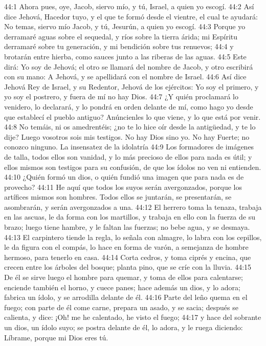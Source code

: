 44:1 Ahora pues, oye, Jacob, siervo mío, y tú, Israel, a quien yo escogí. 
44:2 Así dice Jehová, Hacedor tuyo, y el que te formó desde el vientre, el cual te ayudará: No temas, siervo mío Jacob, y tú, Jesurún, a quien yo escogí. 
44:3 Porque yo derramaré aguas sobre el sequedal, y ríos sobre la tierra árida; mi Espíritu derramaré sobre tu generación, y mi bendición sobre tus renuevos; 
44:4 y brotarán entre hierba, como sauces junto a las riberas de las aguas. 
44:5 Este dirá: Yo soy de Jehová; el otro se llamará del nombre de Jacob, y otro escribirá con su mano: A Jehová, y se apellidará con el nombre de Israel. 
44:6 Así dice Jehová Rey de Israel, y su Redentor, Jehová de los ejércitos: Yo soy el primero, y yo soy el postrero, y fuera de mí no hay Dios. 
44:7 ¿Y quién proclamará lo venidero, lo declarará, y lo pondrá en orden delante de mí, como hago yo desde que establecí el pueblo antiguo? Anúncienles lo que viene, y lo que está por venir. 
44:8 No temáis, ni os amedrentéis; ¿no te lo hice oír desde la antigüedad, y te lo dije? Luego vosotros sois mis testigos. No hay Dios sino yo. No hay Fuerte; no conozco ninguno. 
La insensatez de la idolatría 
44:9 Los formadores de imágenes de talla, todos ellos son vanidad, y lo más precioso de ellos para nada es útil; y ellos mismos son testigos para su confusión, de que los ídolos no ven ni entienden. 
44:10 ¿Quién formó un dios, o quién fundió una imagen que para nada es de provecho? 
44:11 He aquí que todos los suyos serán avergonzados, porque los artífices mismos son hombres. Todos ellos se juntarán, se presentarán, se asombrarán, y serán avergonzados a una. 
44:12 El herrero toma la tenaza, trabaja en las ascuas, le da forma con los martillos, y trabaja en ello con la fuerza de su brazo; luego tiene hambre, y le faltan las fuerzas; no bebe agua, y se desmaya. 
44:13 El carpintero tiende la regla, lo señala con almagre, lo labra con los cepillos, le da figura con el compás, lo hace en forma de varón, a semejanza de hombre hermoso, para tenerlo en casa. 
44:14 Corta cedros, y toma ciprés y encina, que crecen entre los árboles del bosque; planta pino, que se críe con la lluvia. 
44:15 De él se sirve luego el hombre para quemar, y toma de ellos para calentarse; enciende también el horno, y cuece panes; hace además un dios, y lo adora; fabrica un ídolo, y se arrodilla delante de él. 
44:16 Parte del leño quema en el fuego; con parte de él come carne, prepara un asado, y se sacia; después se calienta, y dice: ¡Oh! me he calentado, he visto el fuego; 
44:17 y hace del sobrante un dios, un ídolo suyo; se postra delante de él, lo adora, y le ruega diciendo: Líbrame, porque mi Dios eres tú. 
